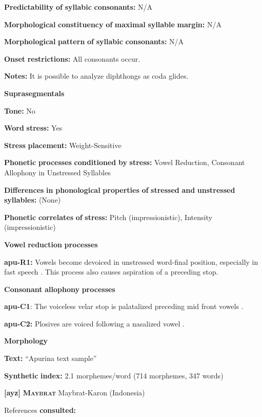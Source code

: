 \textbf{Predictability} \textbf{of} \textbf{syllabic} \textbf{consonants:} N/A

\textbf{Morphological} \textbf{constituency} \textbf{of} \textbf{maximal} \textbf{syllable} \textbf{margin:} N/A

\textbf{Morphological} \textbf{pattern} \textbf{of} \textbf{syllabic} \textbf{consonants:} N/A

\textbf{Onset} \textbf{restrictions:} All consonants occur.

\textbf{Notes:} It is possible to analyze diphthongs as coda glides.

\textbf{Suprasegmentals}

\textbf{Tone:} No

\textbf{Word} \textbf{stress:} Yes

\textbf{Stress} \textbf{placement:} Weight-Sensitive

\textbf{Phonetic} \textbf{processes} \textbf{conditioned} \textbf{by} \textbf{stress:} Vowel Reduction, Consonant Allophony in Unstressed Syllables

\textbf{Differences} \textbf{in} \textbf{phonological} \textbf{properties} \textbf{of} \textbf{stressed} \textbf{and} \textbf{unstressed} \textbf{syllables:} (None)

\textbf{Phonetic} \textbf{correlates} \textbf{of} \textbf{stress:} Pitch (impressionistic), Intensity (impressionistic)

\textbf{Vowel} \textbf{reduction} \textbf{processes}

\textbf{apu-R1:} Vowels become devoiced in unstressed word-final position, especially in fast speech \citep[60-1]{Facundes2000}. This process also causes aspiration of a preceding stop.

\textbf{Consonant} \textbf{allophony} \textbf{processes}

\textbf{apu-C1}: The voiceless velar stop is palatalized preceding mid front vowels \citep[76]{Facundes2000}.

\textbf{apu-C2:} Plosives are voiced following a nasalized vowel \citep[73]{Facundes2000}.

\textbf{Morphology}

\textbf{Text:} “Apurina text sample” \citep[625-642]{Facundes2000}

\textbf{Synthetic} \textbf{index:} 2.1 morphemes/word (714 morphemes, 347 words)

\textbf{[ayz]}   \textbf{\textsc{Maybrat}}  Maybrat-Karon (Indonesia)

References \textbf{consulted:} \citet{Dol2007}

